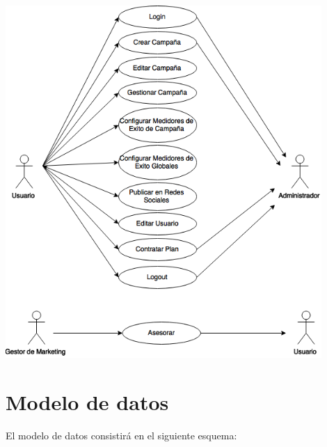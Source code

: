 \documentclass[oneside]{book}
\begin{document}
\includegraphics[width=0.9\textwidth]{images/casosDeUso.png}

\newpage



\section{Modelo de datos}

El modelo de datos consistir\'{a} en el siguiente esquema:
	
\end{document}
